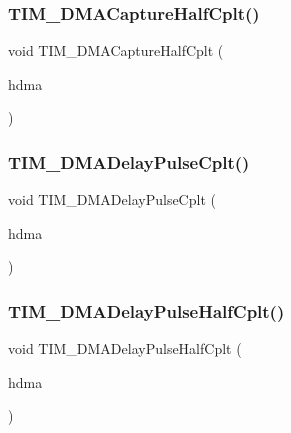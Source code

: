 \subsubsection{\texorpdfstring{T\+I\+M\+\_\+\+D\+M\+A\+Capture\+Half\+Cplt()}{TIM\_DMACaptureHalfCplt()}}
{\footnotesize\ttfamily void T\+I\+M\+\_\+\+D\+M\+A\+Capture\+Half\+Cplt (\begin{DoxyParamCaption}\item[{\hyperlink{group___d_m_a___exported___types_ga41b754a906b86bce54dc79938970138b}{D\+M\+A\+\_\+\+Handle\+Type\+Def} $\ast$}]{hdma }\end{DoxyParamCaption})}

\mbox{\label{group___t_i_m___private___functions_ga78edd2f05a873d68690d8658aa427ccf}} 
\subsubsection{\texorpdfstring{T\+I\+M\+\_\+\+D\+M\+A\+Delay\+Pulse\+Cplt()}{TIM\_DMADelayPulseCplt()}}
{\footnotesize\ttfamily void T\+I\+M\+\_\+\+D\+M\+A\+Delay\+Pulse\+Cplt (\begin{DoxyParamCaption}\item[{\hyperlink{group___d_m_a___exported___types_ga41b754a906b86bce54dc79938970138b}{D\+M\+A\+\_\+\+Handle\+Type\+Def} $\ast$}]{hdma }\end{DoxyParamCaption})}

\mbox{\label{group___t_i_m___private___functions_ga8bfc333f26980f4e473a75cdb45de292}} 
\subsubsection{\texorpdfstring{T\+I\+M\+\_\+\+D\+M\+A\+Delay\+Pulse\+Half\+Cplt()}{TIM\_DMADelayPulseHalfCplt()}}
{\footnotesize\ttfamily void T\+I\+M\+\_\+\+D\+M\+A\+Delay\+Pulse\+Half\+Cplt (\begin{DoxyParamCaption}\item[{\hyperlink{group___d_m_a___exported___types_ga41b754a906b86bce54dc79938970138b}{D\+M\+A\+\_\+\+Handle\+Type\+Def} $\ast$}]{hdma }\end{DoxyParamCaption})}

